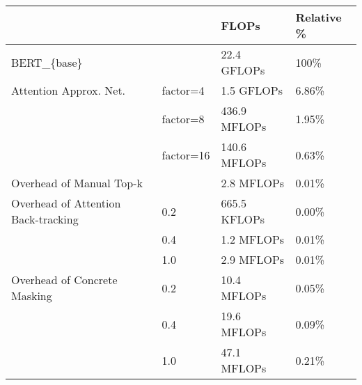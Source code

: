 \begin{tabular}{llll}
\toprule
                             &     &         FLOPs & Relative \% \\
\midrule
BERT\_\{base\} & {} &   22.4 GFLOPs &       100\% \\
Attention Approx. Net. & factor=4 &    1.5 GFLOPs &      6.86\% \\
                             & factor=8 &  436.9 MFLOPs &      1.95\% \\
                             & factor=16 &  140.6 MFLOPs &      0.63\% \\
Overhead of Manual Top-k &     &    2.8 MFLOPs &      0.01\% \\
Overhead of Attention Back-tracking & 0.2 &  665.5 KFLOPs &      0.00\% \\
                             & 0.4 &    1.2 MFLOPs &      0.01\% \\
                             & 1.0 &    2.9 MFLOPs &      0.01\% \\
Overhead of Concrete Masking & 0.2 &   10.4 MFLOPs &      0.05\% \\
                             & 0.4 &   19.6 MFLOPs &      0.09\% \\
                             & 1.0 &   47.1 MFLOPs &      0.21\% \\
\bottomrule
\end{tabular}

